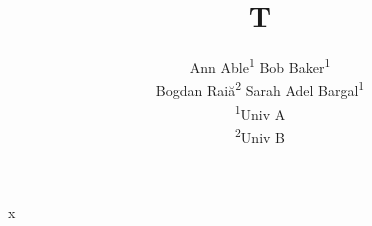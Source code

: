 \documentclass{article}
\begin{document}
\title{T}
\author{Ann Able\textsuperscript{1} \quad Bob Baker\textsuperscript{1} \\
  Bogdan Rai\u{a}\textsuperscript{2} \quad Sarah Adel Bargal\textsuperscript{1} \\
  \textsuperscript{1}Univ A \\
  \textsuperscript{2}Univ B}
\maketitle
x
\end{document}
